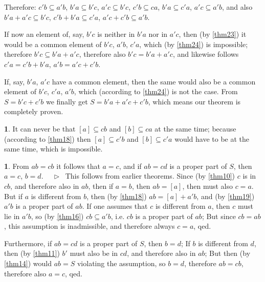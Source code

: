 \documentclass[leqno,hidelinks,10pt]{article}
\theoremstyle{definition}
\newtheorem{satz}{\protect\satzname}
\newtheorem*{zusatz}{\protect\zusatzname}
\newcommand{\satzname}{}
\newcommand{\zusatzname}{}
\renewcommand{\satzname}{\hspace{-4pt}.\ Satz}%
\renewcommand{\zusatzname}{Zusatz}%
\renewcommand{\satzname}{\hspace{-4pt}.\ Theorem}%
\renewcommand{\zusatzname}{Corollary}%
\newcommand\Beweis{\medskip \newline $ \phantom{'.'} \rhd \ $}%
\newcommand{\partof}{\subseteq}
\newcommand{\sref}[1]{\underline{\ref{#1}}}%
\begin{document}
\begin{paracol}{2}
\begin{leftcolumn}

\end{leftcolumn}

\begin{rightcolumn}

\justifying

\normalsize

\noindent
Therefore: $c'b \partof a'b$, $b'a \partof b'c$, $a'c \partof b'c$,
$c'b \partof ca$, $b'a \partof c'a$, $a'c \partof a'b$, and also
$b'a + a'c \partof b'c$, $c'b + b'a \partof c'a$, $a'c + c'b \partof a'b$.



If now an element of, say, $b'c$ is neither in $b'a$ nor in $a'c$, then
(by \sref{thm23}) it would be a common element of $b'c$, $a'b$, $c'a$,
which (by \sref{thm24}) is impossible; therefore $b'c \partof b'a + a'c$,
therefore also $b'c=b'a + a'c$, and likewise follows $c'a=c'b+b'a$, $a'b=a'c+c'b$.

If, say, $b'a$, $a'c$ have a common element, then the same would also be a common
element of $b'c$, $c'a$, $a'b$, which (according to \sref{thm24}) is not the case.
From $S=b'c+c'b$ we finally get $S=b'a+a'c+c'b$, which means our theorem is
completely proven.

\begin{zusatz}
It can never be that $[a] \partof cb$ and $[b] \partof ca$ at the same time;
because (according to \sref{thm18}) then $[a] \partof c'b$ and $[b] \partof c'a$
would have to be at the same time, which is impossible.
\end{zusatz}

\begin{satz}\label{thm26}
From $ab=cb$ it follows that $a=c$, and if $ab=cd$ is a proper part of $S$,
then $a=c$, $b = d$.
\Beweis
This follows from earlier theorems.
Since (by \sref{thm10}) $c$ is in $cb$, and therefore also in $ab$, then if
$a=b$, then $ab = [a]$, then must also $c=a$. But if $a$ is different from $b$,
then (by \sref{thm18}) $ab = [a]+a'b$, and (by \sref{thm19}) $a'b$ is a proper
part of $ab$. If one assumes that $c$ is different from $a$, then $c$ must lie
in $a'b$, so (by \sref{thm16}) $cb \partof a'b$, i.e. $cb$ is a proper part of $ab$;
But since $cb=ab$, this assumption is inadmissible, and therefore always $c=a$, qed.

Furthermore, if $ab=cd$ is a proper part of $S$, then $b=d$; If $b$ is different
from $d$, then (by \sref{thm11}) $b'$ must also be in $cd$, and therefore also in
$ab$; But then (by \sref{thm14}) would $ab = S$ violating the assumption, so $b=d$,
therefore $ab=cb$, therefore also $a=c$, qed.
\end{satz}


\end{rightcolumn}
\end{paracol}
\end{document}
